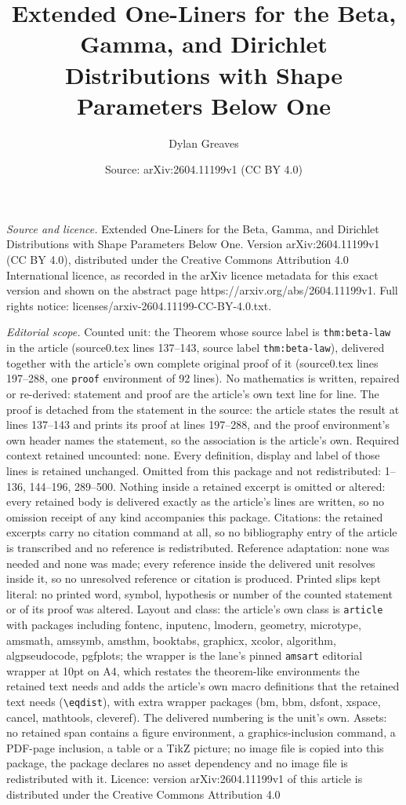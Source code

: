 \documentclass[10pt,a4paper]{amsart}
\title[Extended One-Liners for the Beta, Gamma, and Dirichlet Distr]{Extended One-Liners for the Beta, Gamma, and Dirichlet Distributions with Shape Parameters Below One}
\author{Dylan Greaves}
\date{Source: arXiv:2604.11199v1 (CC BY 4.0)}
\begin{document}
\maketitle

\noindent\emph{Source and licence.} Extended One-Liners for the Beta, Gamma, and Dirichlet Distributions with Shape Parameters Below One. Version arXiv:2604.11199v1 (CC BY 4.0), distributed under the Creative Commons Attribution 4.0 International licence, as recorded in the arXiv licence metadata for this exact version and shown on the abstract page https://arxiv.org/abs/2604.11199v1. Full rights notice: licenses/arxiv-2604.11199-CC-BY-4.0.txt.\par\smallskip

\noindent\textit{Editorial scope.} Counted unit: the Theorem whose source label is \texttt{thm:beta-law} in the article (source0.tex lines 137--143, source label \texttt{thm:beta-law}), delivered together with the article's own complete original proof of it (source0.tex lines 197--288, one \texttt{proof} environment of 92 lines). No mathematics is written, repaired or re-derived: statement and proof are the article's own text line for line. The proof is detached from the statement in the source: the article states the result at lines 137--143 and prints its proof at lines 197--288, and the proof environment's own header names the statement, so the association is the article's own. Required context retained uncounted: none. Every definition, display and label of those lines is retained unchanged. Omitted from this package and not redistributed: 1--136, 144--196, 289--500. Nothing inside a retained excerpt is omitted or altered: every retained body is delivered exactly as the article's lines are written, so no omission receipt of any kind accompanies this package. Citations: the retained excerpts carry no citation command at all, so no bibliography entry of the article is transcribed and no reference is redistributed. Reference adaptation: none was needed and none was made; every reference inside the delivered unit resolves inside it, so no unresolved reference or citation is produced. Printed slips kept literal: no printed word, symbol, hypothesis or number of the counted statement or of its proof was altered. Layout and class: the article's own class is \texttt{article} with packages including fontenc, inputenc, lmodern, geometry, microtype, amsmath, amssymb, amsthm, booktabs, graphicx, xcolor, algorithm, algpseudocode, pgfplots; the wrapper is the lane's pinned \texttt{amsart} editorial wrapper at 10pt on A4, which restates the theorem-like environments the retained text needs and adds the article's own macro definitions that the retained text needs (\texttt{\textbackslash eqdist}), with extra wrapper packages (bm, bbm, dsfont, xspace, cancel, mathtools, cleveref). The delivered numbering is the unit's own. Assets: no retained span contains a figure environment, a graphics-inclusion command, a PDF-page inclusion, a table or a TikZ picture; no image file is copied into this package, the package declares no asset dependency and no image file is redistributed with it. Licence: version arXiv:2604.11199v1 of this article is distributed under the Creative Commons Attribution 4.0 
\end{document}
